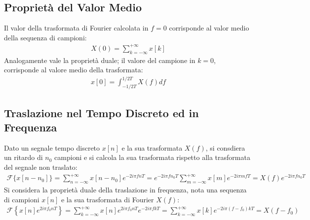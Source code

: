 \documentclass{article}
\numberwithin{equation}{subsection}
\begin{document}
\subsection{Proprietà del Valor Medio}

Il valor della trasformata di Fourier calcolata in $f=0$ corrisponde al valor medio della sequenza di campioni:
\begin{gather*}
    X(0)=\displaystyle\sum_{k=-\infty}^{+\infty}x[k]
\end{gather*}
Analogamente vale la proprietà duale; il valore del campione in $k=0$, corrisponde al valore medio della trasformata:
\begin{gather*}
    x[0]=\displaystyle\int_{-1/2T}^{1/2T}X(f)df
\end{gather*}

\subsection{Traslazione nel Tempo Discreto ed in Frequenza}

Dato un segnale tempo discreto $x[n]$ e la sua trasformata $X(f)$, si consdiera un ritardo di $n_0$ campioni e si calcola la sua trasformata rispetto alla trasformata del 
segnale non traslato:
\begin{gather}
    \mathscr{F}\{x[n-n_0]\}=\displaystyle\sum_{n=-\infty}^{+\infty}x[n-n_0]e^{-2i\pi fnT}=e^{-2i\pi fn_0T}\sum_{m=-\infty}^{+\infty}x[m]e^{-2i\pi mfT}=X(f)e^{-2i\pi fn_0T}
\end{gather}
Si considera la proprietà duale della traslazione in frequenza, nota una sequenza di campioni $x[n]$ e la sua trasformata di Fourier $X(f)$:
\begin{gather*}
    \mathscr{F}\left\{x[n]e^{2i\pi f_0nT}\right\}=\displaystyle\sum_{k=-\infty}^{+\infty}x[n]e^{2i\pi f_0nT}e^{-2i\pi fkT}=\sum_{k=-\infty}^{+\infty}x[k]e^{-2i\pi (f-f_0)kT}=X(f-f_0)
\end{gather*} 
\end{document}

